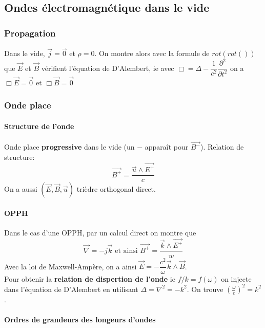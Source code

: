 \documentclass[9pt]{article}
\begin{document}
\begin{multicols*}{2}
\setlength{\columnseprule}{0.1pt}
\part*{Ondes électromagnétique dans le vide}
\section{Propagation}
Dans le vide, $\overrightarrow{j} = \overrightarrow{0}$ et $\rho = 0$. On montre alors avec la formule de $rot(rot())$ que $\overrightarrow{E}$ et $\overrightarrow{B}$ vérifient l'équation de D'Alembert, ie avec
$\Box = \Delta - \dfrac{1}{c^2}\dfrac{\partial^2}{\partial t^2}$ on a $\Box\overrightarrow{E}=\overrightarrow{0}$ et $\Box\overrightarrow{B}=\overrightarrow{0}$

\section{Onde place}
\subsection{Structure de l'onde}
Onde place \textbf{progressive} dans le vide (un $-$ apparaît pour $\overrightarrow{B^-}$). Relation de structure:
$$\boxed{\overrightarrow{B^+} = \frac{\overrightarrow{u}\wedge\overrightarrow{E^+}}{c}}$$
On a aussi $(\overrightarrow{E},\overrightarrow{B},\overrightarrow{u})$ trièdre orthogonal direct.
\subsection{OPPH}
Dans le cas d'une OPPH, par un calcul direct on montre que $$\boxed{\overrightarrow{\nabla} = -j\overrightarrow{k}} \text{ et ainsi } \boxed{\overrightarrow{B^+} = \dfrac{\overrightarrow{k}\wedge\overrightarrow{E^+}}{w}}$$
Avec la loi de Maxwell-Ampère, on a ainsi $\overrightarrow{E}=-\dfrac{c^2}{\omega}\overrightarrow{k}\wedge\overrightarrow{B}$.\\
Pour obtenir la \textbf{relation de dispertion de l'onde} ie $f/k=f(\omega)$ on injecte dans l'équation de D'Alembert en utilisant $\Delta = \nabla^2 = -k^2$. On trouve $\left(\frac{\omega}{c}\right)^2=k^2$.
\subsection{Ordres de grandeurs des longeurs d'ondes}


\end{multicols*}
\end{document}
